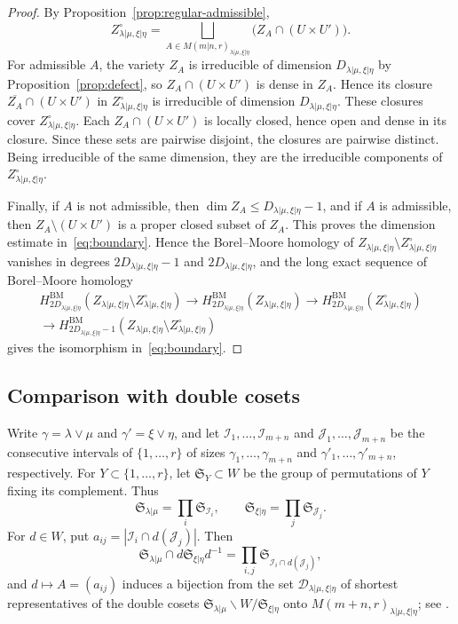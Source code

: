 \documentclass[11pt,a4paper]{amsart}
\theoremstyle{definition}
\theoremstyle{remark}
\newcommand{\BM}{\mathrm{BM}}
\newcommand{\lm}{\lambda|\mu}
\newcommand{\xh}{\xi|\eta}
\newcommand{\Mat}{M(m+n,r)}
\newcommand{\Smat}{M(m|n,r)}
\numberwithin{equation}{section}
\begin{document}
\begin{proof}
By Proposition~\ref{prop:regular-admissible},
$$
Z_{\lm,\xh}^{\circ}=\bigsqcup_{A\in\Smat_{\lm,\xh}}
\bigl(Z_A\cap(U\times U')\bigr).
$$
For admissible $A$, the variety $Z_A$ is irreducible of dimension
$D_{\lm,\xh}$ by Proposition~\ref{prop:defect}, so $Z_A\cap(U\times U')$
is dense in $Z_A$. Hence its closure $\overline{Z_A}\cap(U\times U')$ in
$Z_{\lm,\xh}^{\circ}$ is irreducible of dimension $D_{\lm,\xh}$. These
closures cover $Z_{\lm,\xh}^{\circ}$. Each $Z_A\cap(U\times U')$ is
locally closed, hence open and dense in its closure. Since these sets are
pairwise disjoint, the closures are pairwise distinct. Being irreducible
of the same dimension, they are the irreducible components of
$Z_{\lm,\xh}^{\circ}$.

Finally, if $A$ is not admissible, then $\dim Z_A\le D_{\lm,\xh}-1$, and if
$A$ is admissible, then $Z_A\setminus(U\times U')$ is a proper closed
subset of $Z_A$. This proves the dimension estimate
in~\eqref{eq:boundary}. Hence the Borel--Moore homology of
$Z_{\lm,\xh}\setminus Z_{\lm,\xh}^{\circ}$ vanishes in degrees
$2D_{\lm,\xh}-1$ and $2D_{\lm,\xh}$, and the long exact sequence of
Borel--Moore homology
\begin{multline*}
H^{\BM}_{2D_{\lm,\xh}}(Z_{\lm,\xh}\setminus Z_{\lm,\xh}^{\circ})
\to H^{\BM}_{2D_{\lm,\xh}}(Z_{\lm,\xh})
\to H^{\BM}_{2D_{\lm,\xh}}(Z_{\lm,\xh}^{\circ})\\
\to H^{\BM}_{2D_{\lm,\xh}-1}(Z_{\lm,\xh}\setminus Z_{\lm,\xh}^{\circ})
\end{multline*}
gives the isomorphism in~\eqref{eq:boundary}.
\end{proof}

\subsection{Comparison with double cosets}
\label{sec:double-cosets}

Write $\gamma=\lambda\vee\mu$ and $\gamma'=\xi\vee\eta$, and let
$\mathcal I_1,\ldots,\mathcal I_{m+n}$ and $\mathcal J_1,\ldots,\mathcal J_{m+n}$
be the consecutive intervals of $\{1,\ldots,r\}$ of sizes
$\gamma_1,\ldots,\gamma_{m+n}$ and $\gamma'_1,\ldots,\gamma'_{m+n}$,
respectively. For $Y\subset\{1,\ldots,r\}$, let $\mathfrak S_Y\subset W$ be
the group of permutations of $Y$ fixing its complement. Thus
$$
\mathfrak S_{\lm}=\prod_{i}\mathfrak S_{\mathcal I_i},\qquad
\mathfrak S_{\xh}=\prod_{j}\mathfrak S_{\mathcal J_j}.
$$
For $d\in W$, put $a_{ij}=|\mathcal I_i\cap d(\mathcal J_j)|$. Then
$$
\mathfrak S_{\lm}\cap d\mathfrak S_{\xh}d^{-1}
=\prod_{i,j}\mathfrak S_{\mathcal I_i\cap d(\mathcal J_j)},
$$
and $d\mapsto A=(a_{ij})$ induces a bijection from the set
$\mathcal D_{\lm,\xh}$ of shortest representatives of the double cosets
$\mathfrak S_{\lm}\backslash W/\mathfrak S_{\xh}$ onto $\Mat_{\lm,\xh}$; see
\cite[(3.1.1)]{DuRui}.
\end{document}
